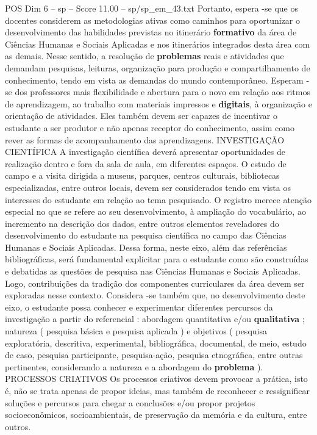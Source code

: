 \begin{textsample}{POS Dim 6 – sp – Score 11.00 – sp/sp\_em\_43.txt}
Portanto, espera -se que os docentes considerem as metodologias ativas como caminhos para oportunizar o desenvolvimento das habilidades previstas no itinerário \textbf{formativo} da área de Ciências Humanas e Sociais Aplicadas e nos itinerários integrados desta área com as demais.
Nesse sentido, a resolução de \textbf{problemas} reais e atividades que demandam pesquisas, leituras, organização para produção e compartilhamento de conhecimento, tendo em vista as demandas do mundo contemporâneo.
Esperam -se dos professores mais flexibilidade e abertura para o novo em relação aos ritmos de aprendizagem, ao trabalho com materiais impressos e \textbf{digitais}, à organização e orientação de atividades.
Eles também devem ser capazes de incentivar o estudante a ser produtor e não apenas receptor do conhecimento, assim como rever as formas de acompanhamento das aprendizagens.
INVESTIGAÇÃO CIENTÍFICA A investigação científica deverá apresentar oportunidades de realização dentro e fora da sala de aula, em diferentes espaços.
O estudo de campo e a visita dirigida a museus, parques, centros culturais, bibliotecas especializadas, entre outros locais, devem ser considerados tendo em vista os interesses do estudante em relação ao tema pesquisado.
O registro merece atenção especial no que se refere ao seu desenvolvimento, à ampliação do vocabulário, ao incremento na descrição dos dados, entre outros elementos reveladores do desenvolvimento do estudante na pesquisa científica no campo das Ciências Humanas e Sociais Aplicadas.
Dessa forma, neste eixo, além das referências bibliográficas, será fundamental explicitar para o estudante como são construídas e debatidas as questões de pesquisa nas Ciências Humanas e Sociais Aplicadas.
Logo, contribuições da tradição dos componentes curriculares da área devem ser exploradas nesse contexto.
Considera -se também que, no desenvolvimento deste eixo, o estudante possa conhecer e experimentar diferentes percursos da investigação a partir do referencial : abordagem quantitativa e/ou \textbf{qualitativa} ; natureza ( pesquisa básica e pesquisa aplicada ) e objetivos ( pesquisa exploratória, descritiva, experimental, bibliográfica, documental, de meio, estudo de caso, pesquisa participante, pesquisa-ação, pesquisa etnográfica, entre outras pertinentes, considerando a natureza e a abordagem do \textbf{problema} ).
PROCESSOS CRIATIVOS Os processos criativos devem provocar a prática, isto é, não se trata apenas de propor ideias, mas também de reconhecer e ressignificar soluções e percursos para chegar a conclusões e/ou propor projetos socioeconômicos, socioambientais, de preservação da memória e da cultura, entre outros.

\end{textsample}
